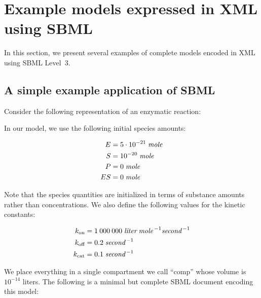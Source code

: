 

\newcommand{\species}[1]{\ensuremath{#1}\xspace}
\newcommand{\concent}[1]{\ensuremath{[#1\mkern1mu]}\xspace}



\section{Example models expressed in XML using SBML}
\label{sec:xml-rep}
\label{sec:examples}

In this section, we present several examples of complete models
encoded in XML using SBML Level~3.


\subsection{A simple example application of SBML}
\label{sec:modeleg}

\newcommand{\kon} {\ensuremath{k_\text{on}}\xspace}
\newcommand{\koff}{\ensuremath{k_\text{off}}\xspace}
\newcommand{\kcat}{\ensuremath{k_\text{cat}}\xspace}

Consider the following representation of an enzymatic reaction:
\begin{center}
  \ce{\species{E} + \species{S} <=>[\kon][\koff] \species{ES} ->[\kcat] \species{E} + \species{P}}
\end{center}
In our model, we use the following initial species amounts:
\begin{linenomath}
  \begin{align*}
    \species{E}  &= 5 \cdot 10^{-21}\; \emph{mole} \\
    \species{S}  &= 10^{-20}\; \emph{mole} \\
    \species{P}  &= 0\; \emph{mole} \\
    \species{ES} &= 0\; \emph{mole}
  \end{align*}
\end{linenomath}
Note that the species quantities are initialized in terms of
substance amounts rather than concentrations.  We also define the
following values for the kinetic constants:
\begin{linenomath}
  \begin{align*}
    \kon         &= 1\:000\:000 \;\emph{liter} \;\emph{mole}^{\,-1} \emph{second}^{\,-1}\\
    \koff        &= 0.2 \;\emph{second}^{\,-1}\\
    \kcat        &= 0.1 \;\emph{second}^{\,-1}
  \end{align*}
\end{linenomath}
We place everything in a single compartment we call ``comp'' whose
volume is $10^{-14}$ liters.  The following is a minimal but
complete SBML document encoding this model:


